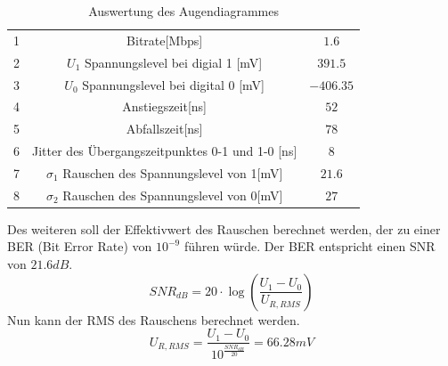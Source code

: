 \documentclass[a4paper,12pt]{article}
\begin{document}
	\newpage
	\begin{table}[h]
		\centering
		\begin{tabular}{|c|c|c|}
			\hline
			\multirow{2}{*}{1} & \multirow{2}{*}{Bitrate[Mbps]} & \multirow{2}{*}{$1.6$} \\
			&  &  \\ \hline
			\multirow{2}{*}{2} & \multirow{2}{*}{$U_1$ Spannungslevel bei digial 1 [mV]} & \multirow{2}{*}{$391.5$} \\
			&  &  \\ \hline
			\multirow{2}{*}{3} & \multirow{2}{*}{$U_0$ Spannungslevel bei digital 0 [mV]} & \multirow{2}{*}{$-406.35$} \\
			&  &  \\ \hline
			\multirow{2}{*}{4} & \multirow{2}{*}{Anstiegszeit[ns]} & \multirow{2}{*}{$52$} \\
			&  &  \\ \hline
			\multirow{2}{*}{5} & \multirow{2}{*}{Abfallszeit[ns]} & \multirow{2}{*}{$78$} \\
			&  &  \\ \hline
			\multirow{2}{*}{6} & \multirow{2}{*}{Jitter des Übergangszeitpunktes 0-1 und 1-0 [ns]} & \multirow{2}{*}{$8$} \\
			&  &  \\ \hline
			\multirow{2}{*}{7} & \multirow{2}{*}{$\sigma_1$ Rauschen des Spannungslevel von 1[mV]} & \multirow{2}{*}{$21.6$} \\
			&  &  \\ \hline
			\multirow{2}{*}{8} & \multirow{2}{*}{$\sigma_2$ Rauschen des Spannungslevel von 0[mV]} & \multirow{2}{*}{$27$} \\
			&  &  \\ \hline
		\end{tabular}
		\caption{Auswertung des Augendiagrammes}
	\end{table}
	\noindent
	Des weiteren soll der Effektivwert des Rauschen berechnet werden, der zu einer BER (Bit Error Rate) von $10^{-9}$ führen würde. Der BER entspricht einen SNR von $21.6dB$.
	\[
		SNR_{dB} = 20 \cdot \log\left(\frac{U_1 - U_0}{U_{R,RMS}}\right)
	\]
	Nun kann der RMS des Rauschens berechnet werden.
	\[
		U_{R,RMS} = \frac{U_1 - U_0}{10^{\frac{SNR_{dB}}{20}}} = 66.28mV
	\]
	\newpage
\end{document}
